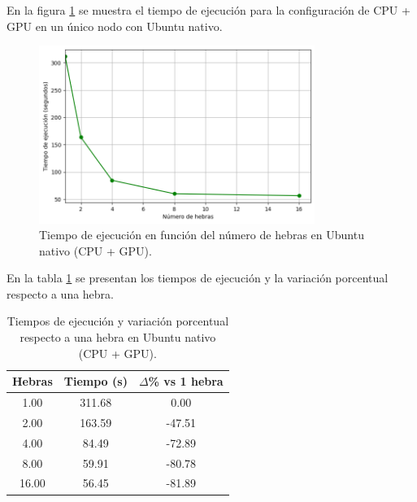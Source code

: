 En la figura \ref{fig:single-node_ubuntu__gpu_native_time} se muestra el tiempo de ejecución para la configuración de CPU + GPU en un único nodo con Ubuntu nativo.

\begin{figure}[H]
    \centering
    \includegraphics[width=0.8\textwidth]{imagenes/cap5/single-node_ubuntu_gpu_native_time.png}
    \caption{Tiempo de ejecución en función del número de hebras en Ubuntu nativo (CPU + GPU).}
    \label{fig:single-node_ubuntu__gpu_native_time}
\end{figure}

En la tabla \ref{tab:single-node_ubuntu_gpu_native} se presentan los tiempos de ejecución y la variación porcentual respecto a una hebra.

\begin{table}[ht]
    \centering
    \begin{tabular}{|c|c|c|}
        \hline
        \textbf{Hebras} & \textbf{Tiempo (s)} & \textbf{$\Delta$\% vs 1 hebra} \\
        \hline
        1.00            & 311.68              & 0.00                           \\
        2.00            & 163.59              & -47.51                         \\
        4.00            & 84.49               & -72.89                         \\
        8.00            & 59.91               & -80.78                         \\
        16.00           & 56.45               & -81.89                         \\
        \hline
    \end{tabular}
    \caption{Tiempos de ejecución y variación porcentual respecto a una hebra en Ubuntu nativo (CPU + GPU).}
    \label{tab:single-node_ubuntu_gpu_native}
\end{table}

